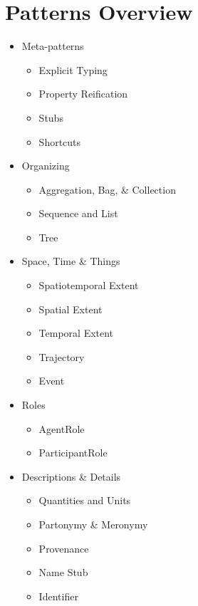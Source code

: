 \section{Patterns Overview}
\label{ssec:pats}
\begin{itemize}
\item Meta-patterns
\begin{itemize}
\item Explicit Typing
\item Property Reification
\item Stubs
\item Shortcuts
\end{itemize}
\item Organizing
\begin{itemize}
\item Aggregation, Bag, \& Collection
\item Sequence and List
\item Tree
\end{itemize}
\item Space, Time \& Things
\begin{itemize}
\item Spatiotemporal Extent
\item Spatial Extent
\item Temporal Extent
\item Trajectory
\item Event
\end{itemize}
\item Roles
\begin{itemize}
\item AgentRole
\item ParticipantRole
\end{itemize}
\item Descriptions \& Details
\begin{itemize}
\item Quantities and Units
\item Partonymy \& Meronymy
\item Provenance
\item Name Stub
\item Identifier
\end{itemize}
\end{itemize}



